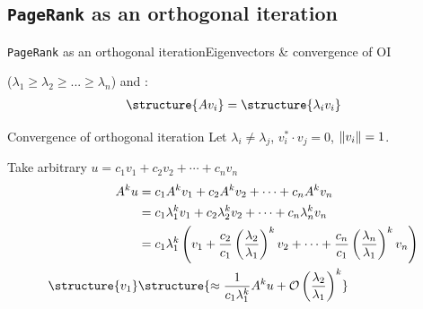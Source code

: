 \documentclass[xcolor=table,final]{beamer} %
\newcommand{\PageRank}{\texttt{PageRank}\xspace}
\begin{document}
\subsection{\PageRank as an orthogonal iteration}
\begin{frame}{\PageRank as an orthogonal iteration}{Eigenvectors \& convergence of OI}
  \begin{definition}
   ({\small $\lambda_1 \ge \lambda_2 \ge ... \ge \lambda_n$}) 
  and :%
  \begin{align*}
    \structure{A v_i} = \structure{\lambda_i v_i}
  \end{align*}
\end{definition}

\begin{block}{Convergence of orthogonal iteration}
  \small
  Let $\lambda_i \neq \lambda_j$, $v_i^*\cdot v_j = 0$, $\norm{v_i} = 1$. 

  Take arbitrary $u = c_{1}v_{1} + c_{2}v_{2} + \cdots + c_{n}v_{n}$
  \begin{align*}
    A^{k}u & =  c_{1}A^{k}v_{1} + c_{2}A^{k}v_{2} + \cdots + c_{n}A^{k}v_{n} \\ 
           & =  c_{1}\lambda_{1}^{k}v_{1} + c_{2}\lambda_{2}^{k}v_{2} + \cdots + c_{n}\lambda_{n}^{k}v_{n} \\ 
           & =  c_{1}\lambda_{1}^{k} \left( v_{1} + \frac{c_{2}}{c_{1}}\left(\frac{\lambda_{2}}{\lambda_{1}}\right)^{k}v_{2} + \cdots + \frac{c_{n}}{c_{1}}\left(\frac{\lambda_{n}}{\lambda_{1}}\right)^{k}v_{n}\right)
    \\
    \structure{v_1} &\structure{\approx \frac{1}{c_{1}\lambda_{1}^{k}} A^{k}u + {\cal O}\left(\frac{\lambda_{2}}{\lambda_{1}}\right)^{k}}
  \end{align*}
\end{block}
\end{frame}
\end{document}
